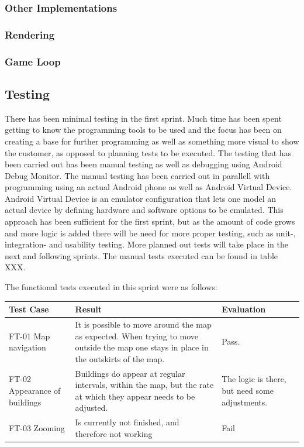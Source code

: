 \subsubsection*{Other Implementations}
	\subsubsection*{Rendering}
	\subsubsection*{Game Loop}

\subsection{Testing}

There has been minimal testing in the first sprint. Much time has been spent getting to know the programming tools to be used and the focus has been on creating a base for further programming as well as something more visual to show the customer, as opposed to planning tests to be executed. The testing that has been carried out has been manual testing as well as debugging using Android Debug Monitor. The manual testing has been carried out in parallell with programming using an actual Android phone as well as Android Virtual Device. Android Virtual Device is an emulator configuration that lets one model an actual device by defining hardware and software options to be emulated. This approach has been sufficient for the first sprint, but as the amount of code grows and more logic is added there will be need for more proper testing, such as unit-, integration- and usability testing. More planned out tests will take place in the next and following sprints. The manual tests executed can be found in table XXX.


The functional tests executed in this sprint were as follows:


\begin{tabular}{| p{2cm} | p{7cm} | p{2cm} |}
	\hline
	\rowcolor{lightgray}
	{\bf Test Case} & {\bf Result} & {\bf Evaluation} \\ \hline
	FT-01 Map navigation & It is possible to move around the map as expected. When trying to move outside the map one stays in place in the outskirts of the map. & Pass. \\ \hline
  	FT-02 Appearance of buildings & Buildings do appear at regular intervals, within the map, but the rate at which they appear needs to be adjusted. & The logic is there, but need some adjustments. \\ \hline
	FT-03 Zooming & Is currently not finished, and therefore not working & Fail \\ \hline
\end{tabular}

